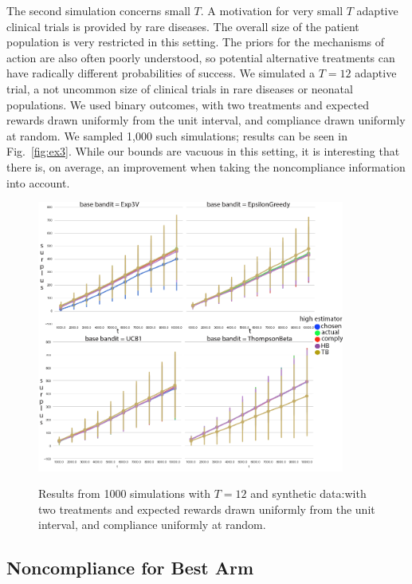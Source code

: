 The second simulation concerns small $T$. A motivation for very small $T$ adaptive clinical trials is provided by rare diseases. The overall size of the patient population is very restricted in this setting.
The priors for the mechanisms of action are also often poorly understood, so potential alternative treatments can have radically different probabilities of success. 
We simulated a $T=12$ adaptive trial, a not uncommon size of clinical trials in rare diseases or neonatal populations. We used binary outcomes, with two treatments and expected rewards drawn uniformly from the unit interval, and compliance drawn uniformly at random. We sampled 1,000 such simulations; results can be seen in Fig.~\eqref{fig:ex3}.
While our bounds are vacuous in this setting, it is interesting that there is, on average, an improvement when taking the noncompliance information into account.


\begin{figure}[t]
	\centering	
	\includegraphics[width=0.9\textwidth]{bandit/figs/ex3.png}\hspace{1cm}
	\label{fig:ex3}
	\caption{Results from 1000 simulations with $T=12$ and synthetic data:with two treatments and expected rewards drawn uniformly from the unit interval, and compliance uniformly at random.}
\end{figure}





\subsection{Noncompliance for Best Arm}


